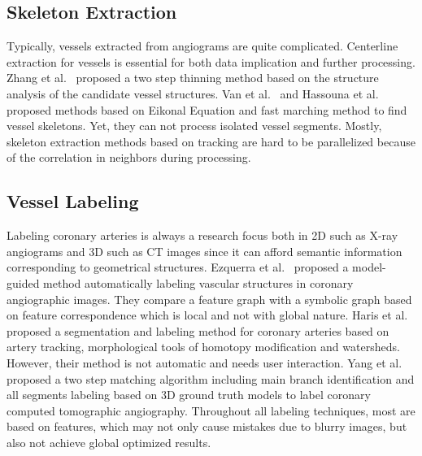 \documentclass[journal]{IEEEtran}
\begin{document}
\subsection{Skeleton Extraction}
Typically, vessels extracted from angiograms are quite complicated.  Centerline extraction for vessels is essential for both data implication and further processing. Zhang et al.~\cite{two_step_thinning} proposed a two step thinning method based on the structure analysis of the candidate vessel structures. Van et al.~\cite{van2007subvoxel} and Hassouna et al.~\cite{Hassouna2007} proposed methods based on Eikonal Equation and fast marching method to find vessel skeletons. Yet, they can not process isolated vessel segments. Mostly, skeleton extraction methods based on tracking are hard to be parallelized because of the correlation in neighbors during processing. 

\subsection{Vessel Labeling}
Labeling coronary arteries is always a research focus both in 2D such as X-ray angiograms and 3D such as CT images since it can afford semantic information corresponding to geometrical structures. Ezquerra et al.~\cite{712132} proposed a model-guided method automatically labeling vascular structures in coronary angiographic images. They compare a feature graph with a symbolic graph based on feature correspondence which is local and not with global nature. Haris et al.~\cite{811312} proposed a segmentation and labeling method for coronary arteries based on artery tracking, morphological tools of homotopy modification and watersheds. However, their method is not automatic and needs user interaction. Yang et al.~\cite{6164514} proposed a two step matching algorithm including main branch identification and all segments labeling based on 3D ground truth models to label coronary computed tomographic angiography. Throughout all labeling techniques, most are based on features, which may not only cause mistakes due to blurry images, but also not achieve global optimized results.
\end{document}
